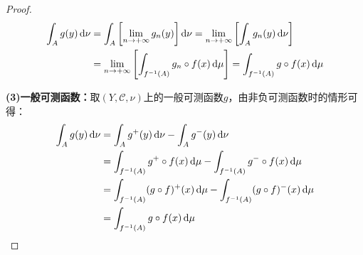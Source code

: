 \begin{proof}
	\begin{align*}
		\int_{A}g(y)\mathop{}\!\mathrm{d}\nu&=\int_{A}\left[\lim_{n\to+\infty}g_n(y)\right]\mathop{}\!\mathrm{d}\nu
		=\lim_{n\to+\infty}\left[\int_{A}g_n(y)\mathop{}\!\mathrm{d}\nu\right] \\
		&=\lim_{n\to+\infty}\left[\int_{f^{-1}(A)}g_n\circ f(x)\mathop{}\!\mathrm{d}\mu\right]
		=\int_{f^{-1}(A)}g\circ f(x)\mathop{}\!\mathrm{d}\mu
	\end{align*}\par
	\textbf{(3)一般可测函数：}取$(Y,\mathscr{C},\nu)$上的一般可测函数$g$，由非负可测函数时的情形可得：
	\begin{align*}
		\int_{A}g(y)\dif\nu&=\int_{A}g^+(y)\dif\nu-\int_{A}g^-(y)\dif\nu \\
		&=\int_{f^{-1}(A)}g^+\circ f(x)\dif\mu-\int_{f^{-1}(A)}g^-\circ f(x)\dif\mu \\
		&=\int_{f^{-1}(A)}(g\circ f)^+(x)\dif\mu-\int_{f^{-1}(A)}(g\circ f)^-(x)\dif\mu \\
		&=\int_{f^{-1}(A)}g\circ f(x)\dif\mu\qedhere
	\end{align*}
\end{proof}